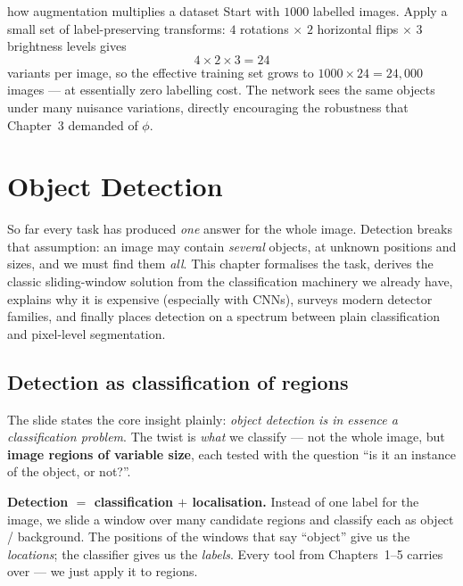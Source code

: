 \documentclass{report}
\begin{document}
\begin{exbox}{how augmentation multiplies a dataset}
Start with $1000$ labelled images. Apply a small set of label-preserving
transforms: $4$ rotations $\times$ $2$ horizontal flips $\times$ $3$ brightness
levels gives
\[
4 \times 2 \times 3 = 24
\]
variants per image, so the effective training set grows to
$1000 \times 24 = 24{,}000$ images --- at essentially zero labelling cost. The
network sees the same objects under many nuisance variations, directly
encouraging the robustness that Chapter~3 demanded of $\phi$.
\end{exbox}





\chapter{Object Detection}

So far every task has produced \emph{one} answer for the whole image. Detection
breaks that assumption: an image may contain \emph{several} objects, at unknown
positions and sizes, and we must find them \emph{all}. This chapter formalises
the task, derives the classic sliding-window solution from the classification
machinery we already have, explains why it is expensive (especially with CNNs),
surveys modern detector families, and finally places detection on a spectrum
between plain classification and pixel-level segmentation.

\section{Detection as classification of regions}

The slide states the core insight plainly: \emph{object detection is in essence
a classification problem}. The twist is \emph{what} we classify --- not the
whole image, but \textbf{image regions of variable size}, each tested with the
question ``is it an instance of the object, or not?''.

\begin{keybox}
\textbf{Detection $=$ classification $+$ localisation.} Instead of one label for
the image, we slide a window over many candidate regions and classify each as
object / background. The positions of the windows that say ``object'' give us
the \emph{locations}; the classifier gives us the \emph{labels}. Every tool from
Chapters~1--5 carries over --- we just apply it to regions.
\end{keybox}
\end{document}
